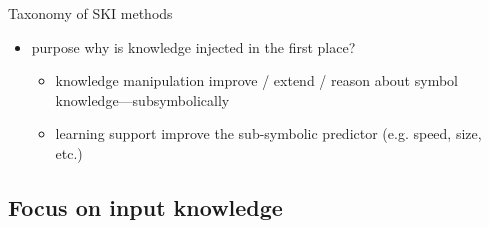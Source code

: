 \documentclass[presentation]{beamer}\mode<presentation>{\usetheme{AMSBolognaFC}}
\begin{document}
\begin{frame}[allowframebreaks]{Taxonomy of SKI methods}
\begin{itemize}
        \item \alert{purpose} why is knowledge injected in the first place?
        \begin{itemize}
            \item \alert{knowledge manipulation} improve / extend / reason about symbol knowledge---subsymbolically
            \item \alert{learning support} improve the sub-symbolic predictor (e.g. speed, size, etc.)
        \end{itemize} 

    \end{itemize}
\end{frame}

\subsection{Focus on input knowledge}
\end{document}
